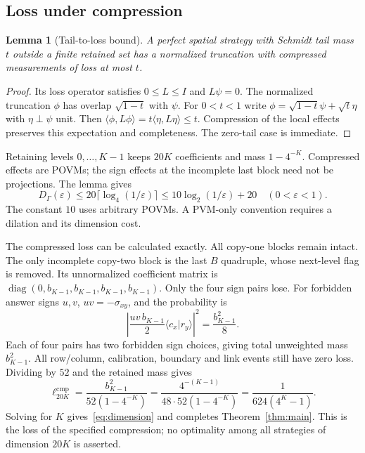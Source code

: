 \documentclass[11pt]{article}
\newtheorem{lemma}[theorem]{Lemma}
\theoremstyle{definition}
\DeclareMathOperator{\diag}{diag}
\newcommand{\eps}{\varepsilon}
\begin{document}
\subsection{Loss under compression}
\begin{lemma}[Tail-to-loss bound]\label{lem:tail}
A perfect spatial strategy with Schmidt tail mass $t$ outside a finite retained set has a normalized truncation with compressed measurements of loss at most $t$.
\end{lemma}
\begin{proof}
Its loss operator satisfies $0\leq L\leq I$ and $L\psi=0$. The normalized truncation $\phi$ has overlap $\sqrt{1-t}$ with $\psi$. For $0<t<1$ write $\phi=\sqrt{1-t}\psi+\sqrt t\eta$ with $\eta\perp\psi$ unit. Then $\langle\phi,L\phi\rangle=t\langle\eta,L\eta\rangle\leq t$. Compression of the local effects preserves this expectation and completeness. The zero-tail case is immediate.
\end{proof}

Retaining levels $0,\ldots,K-1$ keeps $20K$ coefficients and mass $1-4^{-K}$. Compressed effects are POVMs; the sign effects at the incomplete last block need not be projections. The lemma gives
\[
D_\Gamma(\eps)\leq20\lceil\log_4(1/\eps)\rceil
\leq10\log_2(1/\eps)+20\quad(0<\eps<1).
\]
The constant $10$ uses arbitrary POVMs. A PVM-only convention requires a dilation and its dimension cost.

The compressed loss can be calculated exactly. All copy-one blocks remain intact. The only incomplete copy-two block is the last $B$ quadruple, whose next-level flag is removed. Its unnormalized coefficient matrix is $\diag(0,b_{K-1},b_{K-1},b_{K-1},b_{K-1})$. Only the four sign pairs lose. For forbidden answer signs $u,v$, $uv=-\sigma_{xy}$, and the probability is
\[
\left|\frac{uv\,b_{K-1}}2\langle c_x|r_y\rangle\right|^2
=\frac{b_{K-1}^2}{8}.
\]
Each of four pairs has two forbidden sign choices, giving total unweighted mass $b_{K-1}^2$. All row/column, calibration, boundary and link events still have zero loss. Dividing by $52$ and the retained mass gives
\[
\ell^{\mathrm{cmp}}_{20K}=\frac{b_{K-1}^2}{52(1-4^{-K})}
=\frac{4^{-(K-1)}}{48\cdot52(1-4^{-K})}
=\frac{1}{624(4^K-1)}.
\]
Solving for $K$ gives~\eqref{eq:dimension} and completes Theorem~\ref{thm:main}. This is the loss of the specified compression; no optimality among all strategies of dimension $20K$ is asserted.


\end{document}
